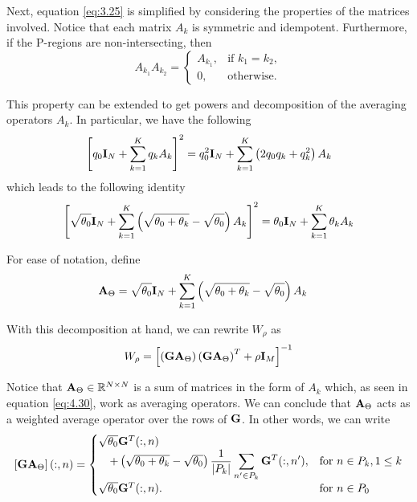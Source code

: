
Next, equation \eqref{eq:3.25} is simplified by considering the properties of the matrices involved.
%
Notice that each matrix $A_k$ is symmetric and idempotent.
%
Furthermore, if the P-regions are non-intersecting, then
\begin{equation}
    A_{k_1} A_{k_2} = 
    \begin{cases}
        A_{k_1}, &\text{if } k_1=k_2, \\
        0, &\text{otherwise.}
    \end{cases}
    \label{eq:3.27}
\end{equation}

This property can be extended to get powers and decomposition of the averaging operators $A_k$.
%
In particular, we have the following
\begin{equation}
    \left[ q_0 \mathbf{I}_N + \sum_{k=1}^K q_k A_k \right]^2
    =
    q_0^2 \mathbf{I}_N + \sum_{k=1}^K \left( 2q_0 q_k + q_k^2 \right) A_k
\end{equation}
which leads to the following identity
\begin{equation}
    \left[ \sqrt{\theta_0} \mathbf{I}_N + \sum_{k=1}^K \left( \sqrt{\theta_0+\theta_k}-\sqrt{\theta_0} \right) A_k \right]^2
    =
    {\theta_0} \mathbf{I}_N + \sum_{k=1}^K {\theta_k} A_k
\end{equation}

For ease of notation, define
\begin{align}
    \mathbf{A}_{\Theta} &=
    \sqrt{\theta_0} \mathbf{I}_N + \sum_{k=1}^K \left( \sqrt{\theta_0+\theta_k}-\sqrt{\theta_0} \right) A_k
\end{align}

With this decomposition at hand, we can rewrite $W_\rho$ as
\begin{equation}
    W_\rho =
    \left[  \left( \mathbf{G} \mathbf{A}_{{\Theta}} \right) \left( \mathbf{G} \mathbf{A}_{{\Theta}} \right)^T
    + \rho \mathbf{I}_M  \right]^{-1}
\end{equation}

Notice that $\mathbf{A}_\Theta\in \mathbb{R}^{N\times N}$ is a sum of matrices in the form of $A_k$ which, as seen in equation \eqref{eq:4.30}, 
work as averaging operators.
%
We can conclude that $\mathbf{A}_\Theta$ acts as a weighted average operator over the rows of $\mathbf{G}$. In other words, we can write
\begin{equation}
    \left[ \mathbf{G} \mathbf{A}_\Theta \right](:, n) =
    \begin{cases}
    \sqrt{\theta_0} \mathbf{G}^T(:,n) 
    \\
    \quad + \left( \sqrt{\theta_0+\theta_k}-\sqrt{\theta_0} \right) \displaystyle\frac{1}{\left| {P_k} \right|} \sum_{n' \in P_k} \mathbf{G}^T(:, n'), &\text{for } n\in P_k, 1\leq k \\
    \sqrt{\theta_0} \mathbf{G}^T(:,n).
    &\text{for } n\in P_0
    \end{cases}
\end{equation}

